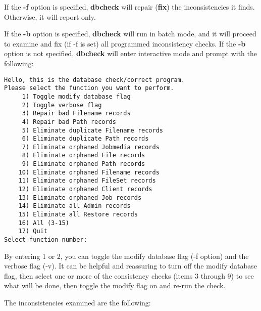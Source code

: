 If the {\bf -f} option is specified, {\bf dbcheck} will repair ({\bf fix}) the
inconsistencies it finds. Otherwise, it will report only.

If the {\bf -b} option is specified, {\bf dbcheck} will run in batch mode, and
it will proceed to examine and fix (if -f is set) all programmed inconsistency
checks. If the {\bf -b} option is not specified, {\bf dbcheck} will enter
interactive mode and prompt with the following:

\footnotesize
\begin{verbatim}
Hello, this is the database check/correct program.
Please select the function you want to perform.
     1) Toggle modify database flag
     2) Toggle verbose flag
     3) Repair bad Filename records
     4) Repair bad Path records
     5) Eliminate duplicate Filename records
     6) Eliminate duplicate Path records
     7) Eliminate orphaned Jobmedia records
     8) Eliminate orphaned File records
     9) Eliminate orphaned Path records
    10) Eliminate orphaned Filename records
    11) Eliminate orphaned FileSet records
    12) Eliminate orphaned Client records
    13) Eliminate orphaned Job records
    14) Eliminate all Admin records
    15) Eliminate all Restore records
    16) All (3-15)
    17) Quit
Select function number:
\end{verbatim}
\normalsize

By entering 1 or 2, you can toggle the modify database flag (-f option) and
the verbose flag (-v). It can be helpful and reassuring to turn off the modify
database flag, then select one or more of the consistency checks (items 3
through 9) to see what will be done, then toggle the modify flag on and re-run
the check.

The inconsistencies examined are the following:

